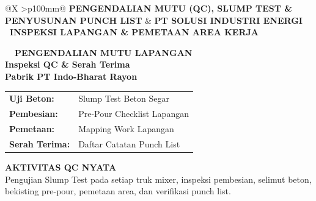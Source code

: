 \documentclass[10pt,a4paper,landscape]{article}
\makeatletter
\newcommand{\makeheader}[3]{%
  \begin{tcolorbox}[sharp corners, boxrule=0pt, colframe=pnavy, colback=pnavy, coltext=white, left=4mm, right=4mm, top=2mm, bottom=2mm, boxsep=0pt, height=13mm, valign=center, borderline west={3.5pt}{0pt}{pred}]
    \begin{tabularx}{\linewidth}{@{}X >{\raggedleft\arraybackslash}p{100mm}@{}}
      {\fontsize{11pt}{13.5pt}\selectfont\bfseries\color{white}#2} &
      {\fontsize{8pt}{10pt}\selectfont\bfseries\color{pbglight}#3}
    \end{tabularx}
  \end{tcolorbox}
  \vspace{2mm}
}
\makeatother
\begin{document}
\newpage
\makeheader{// KELOMPOK 2: MANAJEMEN PELAKSANAAN \& PENGAWASAN // PROYEK 05}{PENGENDALIAN MUTU (QC), SLUMP TEST \& PENYUSUNAN PUNCH LIST}{PT SOLUSI INDUSTRI ENERGI \textbar\ INSPEKSI LAPANGAN \& PEMETAAN AREA KERJA}

\noindent
\begin{minipage}[t]{0.30\linewidth}
  \vspace{0pt}
  \begin{tcolorbox}[sharp corners, boxrule=0.8pt, colframe=pborder, colback=white, left=3mm, right=3mm, top=2.5mm, bottom=2.5mm, height=100mm]
    \colorbox{pred}{\fontsize{7pt}{8pt}\selectfont\bfseries\color{white}\ \ PENGENDALIAN MUTU LAPANGAN\ \ }\\[1.5mm]
    {\fontsize{9.5pt}{11.5pt}\selectfont\bfseries\color{pnavy}Inspeksi QC \& Serah Terima}\\[0.5mm]
    {\fontsize{7pt}{8.5pt}\selectfont\bfseries\color{pred}Pabrik PT Indo-Bharat Rayon}\\[2mm]

    \begin{tcolorbox}[sharp corners, boxrule=0.5pt, colframe=pborder, colback=pbglight, left=2mm, right=2mm, top=1.5mm, bottom=1.5mm]
      \begin{tabularx}{\linewidth}{@{}p{22mm} X@{}}
        {\fontsize{6.8pt}{8pt}\selectfont\bfseries Uji Beton:} & {\fontsize{6.8pt}{8pt}\selectfont Slump Test Beton Segar} \\[0.8mm]
        {\fontsize{6.8pt}{8pt}\selectfont\bfseries Pembesian:} & {\fontsize{6.8pt}{8pt}\selectfont Pre-Pour Checklist Lapangan} \\[0.8mm]
        {\fontsize{6.8pt}{8pt}\selectfont\bfseries Pemetaan:} & {\fontsize{6.8pt}{8pt}\selectfont Mapping Work Lapangan} \\[0.8mm]
        {\fontsize{6.8pt}{8pt}\selectfont\bfseries Serah Terima:} & {\fontsize{6.8pt}{8pt}\selectfont Daftar Catatan Punch List}
      \end{tabularx}
    \end{tcolorbox}
    \vspace{1.5mm}

    {\fontsize{7.5pt}{9pt}\selectfont\bfseries\color{pnavy}AKTIVITAS QC NYATA}\\[0.8mm]
    {\fontsize{6.5pt}{8.2pt}\selectfont\color{psteel}
    Pengujian Slump Test pada setiap truk mixer, inspeksi pembesian, selimut beton, bekisting pre-pour, pemetaan area, dan verifikasi punch list.
    }
  \end{tcolorbox}
  \vspace{2mm}


\end{minipage}
\end{document}

